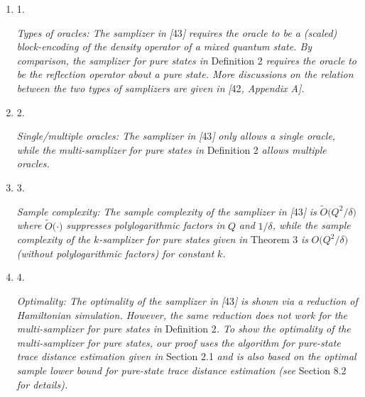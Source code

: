 \documentclass[10pt,a4paper]{article}
\begin{document}
\begin{enumerate}


\item[] 
1. 


\emph{Types of oracles: The samplizer in }\emph{[}43\emph{]}\emph{ requires the oracle to be a (scaled) block-encoding of the density operator of a mixed quantum state. By comparison, the samplizer for pure states in }Definition 2\emph{ requires the oracle to be the reflection operator about a pure state. More discussions on the relation between the two types of samplizers are given in }\emph{[}42\emph{, Appendix A]}\emph{.}\par





\item[] 
2. 


\emph{Single/multiple oracles: The samplizer in }\emph{[}43\emph{]}\emph{ only allows a single oracle, while the multi-samplizer for pure states in }Definition 2\emph{ allows multiple oracles.}\par





\item[] 
3. 


\emph{Sample complexity: The sample complexity of the samplizer in }\emph{[}43\emph{]}\emph{ is }$\widetilde{O}\lparen Q^{2}/\delta\rparen$\emph{ where }$\widetilde{O}\lparen\cdot\rparen$\emph{ suppresses polylogarithmic factors in }$Q$\emph{ and }$1/\delta$\emph{, while the sample complexity of the }$k$\emph{-samplizer for pure states given in }Theorem 3\emph{ is }$O\lparen Q^{2}/\delta\rparen$\emph{ (without polylogarithmic factors) for constant }$k$\emph{.}\par





\item[] 
4. 


\emph{Optimality: The optimality of the samplizer in }\emph{[}43\emph{]}\emph{ is shown via a reduction of Hamiltonian simulation.
However, the same reduction does not work for the multi-samplizer for pure states in }Definition 2\emph{.
To show the optimality of the multi-samplizer for pure states, our proof uses the algorithm for pure-state trace distance estimation given in }Section 2.1\emph{ and is also based on the optimal sample lower bound for pure-state trace distance estimation (see }Section 8.2\emph{ for details).}\par





\end{enumerate}
\end{document}
